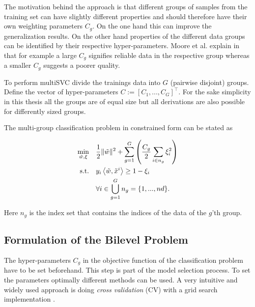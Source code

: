 The motivation behind the approach is that different groups of samples from the training set can have slightly different properties and should therefore have their own weighting parameters \(C_g\).
On the one hand this can improve the generalization results. On the other hand properties of the different data groups can be identified by their respective hyper-parameters. Moore et al. explain in \cite[section 4.3, p. 9]{Moore2011} that for example a large \(C_g\) signifies reliable data in the respective group whereas a smaller \(C_g\) suggests a poorer quality.

To perform multiSVC divide the trainings data into \(G\) (pairwise disjoint) groups.
Define the vector of hyper-parameters \(C := [C_1,...,C_G]^{\top}\). For the sake simplicity in this thesis all the groups are of equal size but all derivations are also possible for differently sized groups.

The multi-group classification problem in constrained form can be stated as 

\begin{align}
\begin{split}
	\min_{\tilde{w},\xi} \quad & \frac{1}{2} \|\tilde{w}\|^2+\sum_{g = 1}^G\left(\frac{C_g}{2}\sum_{i \in n_g} {\xi_i^2}\right) \vspace{0.5ex}\\
	\text{s.t.} \quad & y_i\Langle \tilde{w},\tilde{x}^i\Rangle \geq 1 - \xi_i \vspace{0.5ex}\\
	& 	\forall i \in \bigcup_{g =1}^G n_g =\{1,...,nd\}.
\end{split}
\label{MultiSVC_QP}
\end{align}

Here \(n_g\) is the index set that contains the indices of the data of the \(g\)'th group.


\subsection{Formulation of the Bilevel Problem}


The hyper-parameters \(C_g\) in the objective function of the classification problem have to be set beforehand. This step is part of the model selection process.
To set the parameters optimally different methods can be used.
A very intuitive and widely used approach is doing \emph{cross validation} (CV) with a grid search implementation \cite[p. 30]{Kunapuli2008}.

